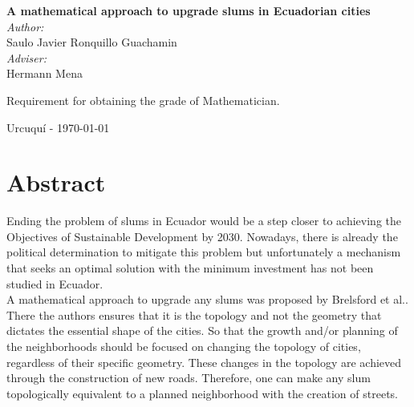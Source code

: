 \documentclass[10pt]{article}
\begin{document}
\begin{center}
  \vspace*{1cm}

  { \huge \bfseries A mathematical approach to upgrade slums in Ecuadorian 
cities}\\[0.4cm]	
  \vspace*{2cm}
  { \large 
    \emph{Author:} \\	
      Saulo Javier Ronquillo Guachamin \\
    \vspace*{1cm}
    \emph{Adviser:} \\
      Hermann Mena	\\
  }

  \vspace{2cm}
    Requirement for obtaining the grade of Mathematician.	\\	

  \vspace{2cm} 	
  \begin{center}
    {Urcuquí - \today}
  \end{center}
  
\end{center}
																		
\newpage																		

\tableofcontents 

\newpage
\section*{Abstract}
Ending the problem of slums in Ecuador would be a step closer to achieving the Objectives of Sustainable Development by 2030. Nowadays, there is already the political determination to mitigate this problem but unfortunately a mechanism that seeks an optimal solution with the minimum investment has not been studied in Ecuador.\\

A mathematical approach to upgrade any slums was proposed by Brelsford et al.\cite{bre}. There the authors ensures that it is the topology and not the geometry that dictates the essential shape of the cities. So that the growth and/or planning of the neighborhoods should be focused on changing the topology of cities, regardless of their specific geometry. These changes in the topology are achieved through the construction of new roads. Therefore, one can make any slum topologically equivalent to a planned neighborhood with the creation of streets.\\
\end{document}
